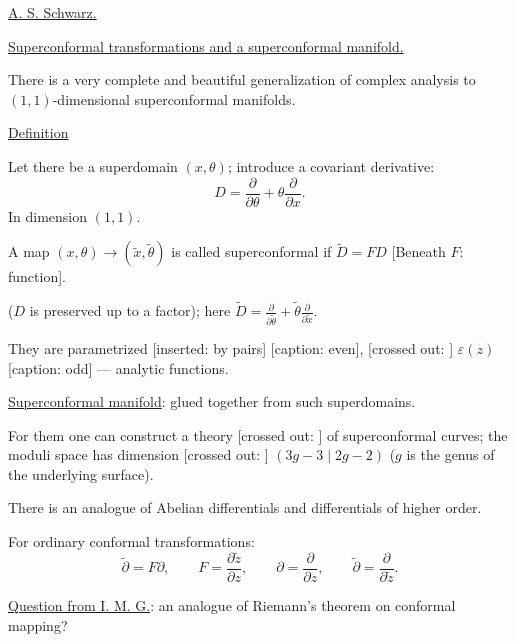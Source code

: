 \underline{A. S. Schwarz.}

\underline{Superconformal transformations and a superconformal manifold.}

There is a very complete and beautiful generalization of complex analysis to $(1,1)$-dimensional
superconformal manifolds.

\underline{Definition}

Let there be a superdomain $(x,\theta)$; introduce a covariant derivative:
\begin{equation*}
D=\frac{\partial}{\partial\theta}+\theta\frac{\partial}{\partial x}.
\tag{1}
\end{equation*}
In dimension $(1,1)$.

A map $(x,\theta)\to(\widetilde x,\widetilde\theta)$ is called superconformal if
$\widetilde D=FD$ [Beneath $F$: function].

($D$ is preserved up to a factor); here
$\widetilde D=\frac{\partial}{\partial\widetilde\theta}
+\widetilde\theta\frac{\partial}{\partial\widetilde x}$.

They are parametrized [inserted: by pairs]
[caption: even],
[crossed out: ]
$\varepsilon(z)$ [caption: odd] --- analytic functions.

\underline{Superconformal manifold}: glued together from such superdomains.

For them one can construct a theory
[crossed out: ]
of superconformal curves;
the moduli space has dimension
[crossed out: ]
$(3g-3\mid2g-2)$
($g$ is the genus of the underlying surface).

There is an analogue of Abelian differentials and differentials of higher order.

For ordinary conformal transformations:
\begin{equation*}
\widetilde\partial=F\partial,\qquad
F=\frac{\partial\widetilde z}{\partial z},\qquad
\partial=\frac{\partial}{\partial z},\qquad
\widetilde\partial=\frac{\partial}{\partial\widetilde z}.
\end{equation*}

\underline{Question from I. M. G.}: an analogue of Riemann's theorem on conformal mapping?

